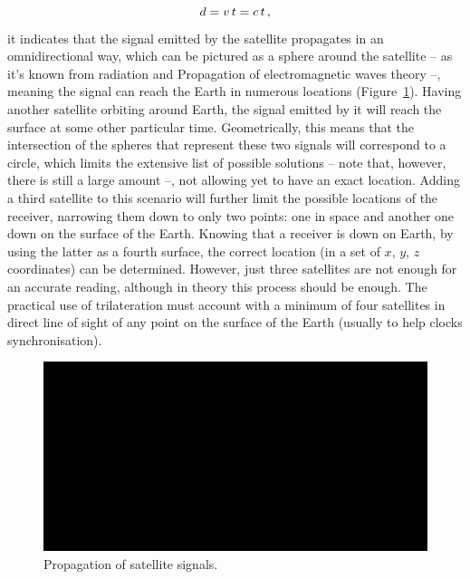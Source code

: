 \begin{equation}
    d = v\,t = c\,t\,,\medskip
\end{equation}
it indicates that the signal emitted by the satellite propagates in an omnidirectional way, which can be pictured as a sphere around the satellite -- as it's known from radiation and Propagation of electromagnetic waves theory --, meaning the signal can reach the Earth in numerous locations (Figure~\ref{fig:omnidirectional}).
Having another satellite orbiting around Earth, the signal emitted by it will reach the surface at some other particular time. Geometrically, this means that the intersection of the spheres that represent these two signals will correspond to a circle, which limits the extensive list of possible solutions -- note that, however, there is still a large amount --, not allowing yet to have an exact location. Adding a third satellite to this scenario will further limit the possible locations of the receiver, narrowing them down to only two points: one in space and another one down on the surface of the Earth. Knowing that a receiver is down on Earth, by using the latter as a fourth surface, the correct location (in a set of $x$, $y$, $z$ coordinates) can be determined.
However, just three satellites are not enough for an accurate reading, although in theory this process should be enough. The practical use of trilateration must account with a minimum of four satellites in direct line of sight of any point on the surface of the Earth (usually to help clocks synchronisation).%
\begin{figure}[htbp]
	\centering
	\includegraphics[width=1.0\textwidth]{Chapters/Figures/demo.png}
	\caption{Propagation of satellite signals.}
	\label{fig:omnidirectional}
\end{figure}

